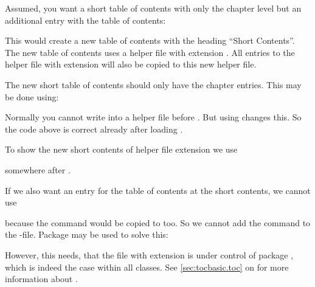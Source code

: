 \begin{Example}
Assumed, you want a short table of contents
with only the chapter level but an additional entry with the table of
contents:
\begin{lstcode}
  \usepackage{scrwfile}
\end{lstcode}
This would create a new table of contents with the heading ``Short
Contents''. The new table of contents uses a helper file with extension
. All entries to the helper file with extension  will
also be copied to this new helper file.

The new short table of contents should only have the chapter entries. This may
be done using:
\begin{lstcode}
\end{lstcode}
Normally you cannot write into a helper file before
. But using  changes
this. So the code above is correct already after loading .

To show the new short contents of helper file extension  we
use
\begin{lstcode}[moretexcs={listofsttoc}]
  \listofstoc
\end{lstcode}
somewhere after .

If we also want an entry for the table of contents at the short contents, we
cannot use
\begin{lstcode}
\end{lstcode}
because the  command would be copied to 
too. So we cannot add the command to the -file. Package
 may be used to solve this:
\begin{lstcode}
\end{lstcode}
However, this needs, that the file with extension  is under control
of package , which is indeed the case within all
\KOMAScript{} classes.  See \autoref{sec:tocbasic.toc} on
 for more information about
.%
\end{Example}
\EndIndexGroup


